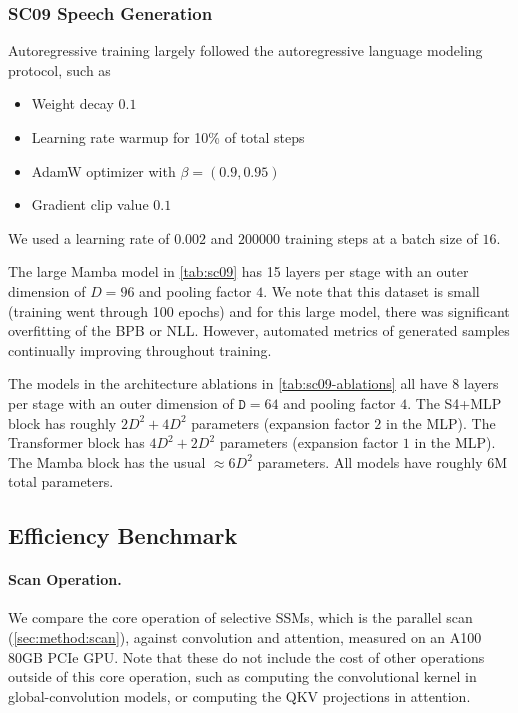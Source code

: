 \subsubsection{SC09 Speech Generation}

Autoregressive training largely followed the autoregressive language modeling protocol, such as
\begin{itemize}
  \item Weight decay $0.1$
  \item Learning rate warmup for 10\% of total steps
  \item AdamW optimizer with $\beta=(0.9, 0.95)$
  \item Gradient clip value $0.1$
\end{itemize}
We used a learning rate of $0.002$ and $200000$ training steps at a batch size of $16$.

The large Mamba model in \cref{tab:sc09} has 15 layers per stage with an outer dimension of $D=96$ and pooling factor $4$.
We note that this dataset is small (training went through 100 epochs) and for this large model, there was significant overfitting of the BPB or NLL. However, automated metrics of generated samples continually improving throughout training.

The models in the architecture ablations in \cref{tab:sc09-ablations}
all have 8 layers per stage with an outer dimension of $\mathtt{D}=64$ and pooling factor $4$.
The S4+MLP block has roughly $2D^2 + 4D^2$ parameters (expansion factor $2$ in the MLP).
The Transformer block has $4D^2 + 2D^2$ parameters (expansion factor $1$ in the MLP).
The Mamba block has the usual $\approx 6D^2$ parameters.
All models have roughly 6M total parameters.


\subsection{Efficiency Benchmark}
\label{sec:exp-details:benchmark}

\paragraph{Scan Operation.}
We compare the core operation of selective SSMs, which is the parallel scan (\cref{sec:method:scan}), against convolution and attention, measured on an A100 80GB PCIe GPU.
Note that these do not include the cost of other operations outside of this core operation, such as computing the convolutional kernel in global-convolution models, or computing the QKV projections in attention.

